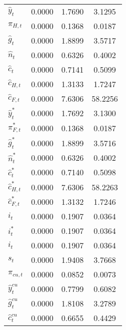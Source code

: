 \begin{center}
\begin{longtable}{lccc}
${\hat y_t}               $	 & 	       0.0000	 & 	       1.7690	 & 	       3.1295 \\ 
${\pi_{H,t}}              $	 & 	       0.0000	 & 	       0.1368	 & 	       0.0187 \\ 
${\hat g_t}               $	 & 	       0.0000	 & 	       1.8899	 & 	       3.5717 \\ 
${\hat n_t}               $	 & 	       0.0000	 & 	       0.6326	 & 	       0.4002 \\ 
${\hat c_t}               $	 & 	       0.0000	 & 	       0.7141	 & 	       0.5099 \\ 
${\hat c_{H,t}}           $	 & 	       0.0000	 & 	       1.3133	 & 	       1.7247 \\ 
${\hat c_{F,t}}           $	 & 	       0.0000	 & 	       7.6306	 & 	      58.2256 \\ 
${\hat y_t^*}             $	 & 	       0.0000	 & 	       1.7692	 & 	       3.1300 \\ 
${\pi_{F,t}^*}            $	 & 	       0.0000	 & 	       0.1368	 & 	       0.0187 \\ 
${\hat g_t^*}             $	 & 	       0.0000	 & 	       1.8899	 & 	       3.5716 \\ 
${\hat n_t^*}             $	 & 	       0.0000	 & 	       0.6326	 & 	       0.4002 \\ 
${\hat c_t^*}             $	 & 	       0.0000	 & 	       0.7140	 & 	       0.5098 \\ 
${\hat c_{H,t}^*}         $	 & 	       0.0000	 & 	       7.6306	 & 	      58.2263 \\ 
${\hat c_{F,t}^*}         $	 & 	       0.0000	 & 	       1.3132	 & 	       1.7246 \\ 
${i_t}                    $	 & 	       0.0000	 & 	       0.1907	 & 	       0.0364 \\ 
${i_t^*}                  $	 & 	       0.0000	 & 	       0.1907	 & 	       0.0364 \\ 
${i_t}                    $	 & 	       0.0000	 & 	       0.1907	 & 	       0.0364 \\ 
${s_t}                    $	 & 	       0.0000	 & 	       1.9408	 & 	       3.7668 \\ 
${\pi_{cu,t}}             $	 & 	       0.0000	 & 	       0.0852	 & 	       0.0073 \\ 
${\hat y_t^{cu}}          $	 & 	       0.0000	 & 	       0.7799	 & 	       0.6082 \\ 
${\hat g_t^{cu}}          $	 & 	       0.0000	 & 	       1.8108	 & 	       3.2789 \\ 
${\hat c_t^{cu}}          $	 & 	       0.0000	 & 	       0.6655	 & 	       0.4429 \\ 
\end{longtable}
 \end{center}
